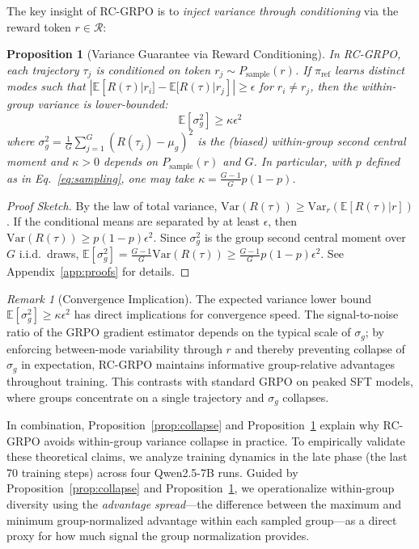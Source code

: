 \documentclass{article}
\theoremstyle{plain}
\newtheorem{proposition}[theorem]{Proposition}
\theoremstyle{definition}
\theoremstyle{remark}
\newtheorem{remark}[theorem]{Remark}
\begin{document}
The key insight of RC-GRPO is to \emph{inject variance through conditioning} via the reward token $r \in \mathcal{R}$:

\begin{proposition}[Variance Guarantee via Reward Conditioning]
\label{prop:variance}
In RC-GRPO, each trajectory $\tau_j$ is conditioned on token $r_j \sim P_{\text{sample}}(r)$. If $\pi_{\text{ref}}$ learns distinct modes such that $|\mathbb{E}[R(\tau)|r_i] - \mathbb{E}[R(\tau)|r_j]| \geq \epsilon$ for $r_i \neq r_j$, then the within-group variance is lower-bounded:
\begin{equation}
\mathbb{E}\left[\sigma_g^2\right] \geq \kappa \epsilon^2
\end{equation}
where $\sigma_g^2 = \frac{1}{G}\sum_{j=1}^G (R(\tau_j)-\mu_g)^2$ is the (biased) within-group second central moment and $\kappa > 0$ depends on $P_{\text{sample}}(r)$ and $G$. In particular, with $p$ defined as in Eq.~\ref{eq:sampling}, one may take $\kappa=\frac{G-1}{G}p(1-p)$.
\end{proposition}

\begin{proof}[Proof Sketch]
By the law of total variance, $\text{Var}(R(\tau)) \ge \text{Var}_{r}(\mathbb{E}[R(\tau)|r])$. If the conditional means are separated by at least $\epsilon$, then $\text{Var}(R(\tau))\ge p(1-p)\epsilon^2$. Since $\sigma_g^2$ is the group second central moment over $G$ i.i.d.\ draws, $\mathbb{E}[\sigma_g^2]=\frac{G-1}{G}\text{Var}(R(\tau)) \ge \frac{G-1}{G}p(1-p)\epsilon^2$. See Appendix~\ref{app:proofs} for details.
\end{proof}

\begin{remark}[Convergence Implication]
\label{rem:convergence}
The expected variance lower bound $\mathbb{E}[\sigma_g^2] \geq \kappa\epsilon^2$ has direct implications for convergence speed. The signal-to-noise ratio of the GRPO gradient estimator depends on the typical scale of $\sigma_g$; by enforcing between-mode variability through $r$ and thereby preventing collapse of $\sigma_g$ in expectation, RC-GRPO maintains informative group-relative advantages throughout training. This contrasts with standard GRPO on peaked SFT models, where groups concentrate on a single trajectory and $\sigma_g$ collapses.
\end{remark}

In combination, Proposition~\ref{prop:collapse} and Proposition~\ref{prop:variance} explain why RC-GRPO avoids within-group variance collapse in practice. To empirically validate these theoretical claims, we analyze training dynamics in the late phase (the last 70 training steps) across four Qwen2.5-7B runs. Guided by Proposition~\ref{prop:collapse} and Proposition~\ref{prop:variance}, we operationalize within-group diversity using the \emph{advantage spread}---the difference between the maximum and minimum group-normalized advantage within each sampled group---as a direct proxy for how much signal the group normalization provides.
\end{document}
